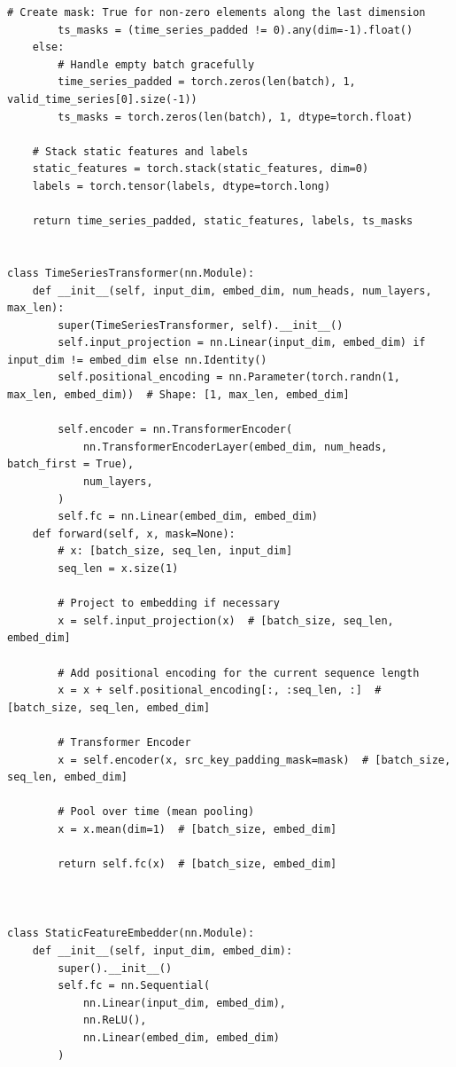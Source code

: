 \begin{appendices}
\begin{mdframed}
\begin{lstlisting}[breaklines=true]
        # Create mask: True for non-zero elements along the last dimension
        ts_masks = (time_series_padded != 0).any(dim=-1).float()
    else:
        # Handle empty batch gracefully
        time_series_padded = torch.zeros(len(batch), 1, valid_time_series[0].size(-1))
        ts_masks = torch.zeros(len(batch), 1, dtype=torch.float)

    # Stack static features and labels
    static_features = torch.stack(static_features, dim=0)
    labels = torch.tensor(labels, dtype=torch.long)

    return time_series_padded, static_features, labels, ts_masks


class TimeSeriesTransformer(nn.Module):
    def __init__(self, input_dim, embed_dim, num_heads, num_layers, max_len):
        super(TimeSeriesTransformer, self).__init__()
        self.input_projection = nn.Linear(input_dim, embed_dim) if input_dim != embed_dim else nn.Identity()
        self.positional_encoding = nn.Parameter(torch.randn(1, max_len, embed_dim))  # Shape: [1, max_len, embed_dim]
        
        self.encoder = nn.TransformerEncoder(
            nn.TransformerEncoderLayer(embed_dim, num_heads, batch_first = True),
            num_layers,
        )
        self.fc = nn.Linear(embed_dim, embed_dim)
    def forward(self, x, mask=None):
        # x: [batch_size, seq_len, input_dim]
        seq_len = x.size(1)
    
        # Project to embedding if necessary
        x = self.input_projection(x)  # [batch_size, seq_len, embed_dim]
    
        # Add positional encoding for the current sequence length
        x = x + self.positional_encoding[:, :seq_len, :]  # [batch_size, seq_len, embed_dim]
    
        # Transformer Encoder
        x = self.encoder(x, src_key_padding_mask=mask)  # [batch_size, seq_len, embed_dim]
    
        # Pool over time (mean pooling)
        x = x.mean(dim=1)  # [batch_size, embed_dim]
    
        return self.fc(x)  # [batch_size, embed_dim]



class StaticFeatureEmbedder(nn.Module):
    def __init__(self, input_dim, embed_dim):
        super().__init__()
        self.fc = nn.Sequential(
            nn.Linear(input_dim, embed_dim),
            nn.ReLU(),
            nn.Linear(embed_dim, embed_dim)
        )


\end{lstlisting}
\end{mdframed}
\end{appendices}

